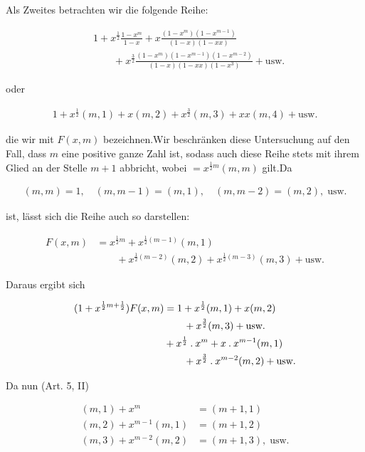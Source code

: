 
Als Zweites betrachten wir die folgende Reihe:

\[
\begin{aligned}
&1+x^{\frac12}\frac{1-x^m}{1-x}+x\frac{(1-x^m)(1-x^{m-1})}{(1-x)(1-xx)}\\
&\qquad+x^{\frac32}\frac{(1-x^m)(1-x^{m-1})(1-x^{m-2})}{(1-x)(1-xx)(1-x^3)}+\text{usw.}
\end{aligned}
\]

oder

\[
\begin{aligned}
1+x^{\frac12}(m,1)+x(m,2)+x^{\frac32}(m,3)+xx(m,4)+\text{usw.}
\end{aligned}
\]

die wir mit $F(x,m)$ bezeichnen.\quad Wir beschränken diese Untersuchung auf den Fall, dass $m$ eine positive ganze Zahl ist, sodass auch diese Reihe stets
mit ihrem Glied an der Stelle $m+1$ abbricht, wobei $=x^{\frac12m}(m,m)$ gilt.\quad Da

\[
\begin{aligned}
(m,m)=1,\quad(m,m-1)=(m,1),\quad(m,m-2)=(m,2),\;\text{usw.}
\end{aligned}
\]

ist, lässt sich die Reihe auch so darstellen:

\[
\begin{aligned}
F(x,m)&=x^{\frac12m}+x^{\frac12(m-1)}(m,1)\\&\qquad+x^{\frac12(m-2)}(m,2)+x^{\frac12(m-3)}(m,3)+\text{usw.}
\end{aligned}
\]

Daraus ergibt sich

\[
\begin{aligned}
(1+x^{\frac12m+\frac12})F(x,m)&=1+x^{\frac12}(m,1)+x(m,2)\\&\qquad+x^{\frac32}(m,3)+\text{usw.}\\
&+x^{\frac12}\mathbin{.} x^m+x\mathbin{.} x^{m-1}(m,1)\\&\qquad+x^{\frac32}\mathbin{.} x^{m-2}(m,2)+\text{usw.}
\end{aligned}
\]

Da nun (Art. 5, II)

\[
\begin{aligned}
(m,1)+x^m&=(m+1,1)\\
(m,2)+x^{m-1}(m,1)&=(m+1,2)\\
(m,3)+x^{m-2}(m,2)&=(m+1,3),\;\text{usw.}
\end{aligned}
\]

